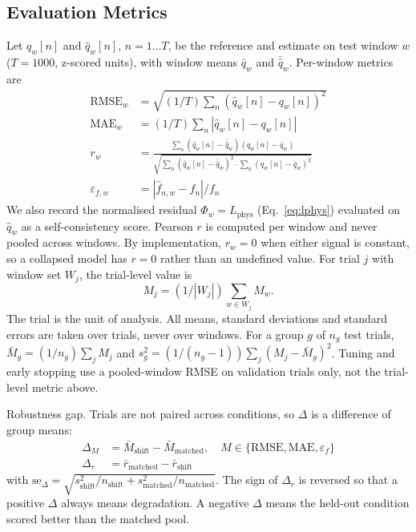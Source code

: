 \documentclass[conference]{IEEEtran}
\begin{document}
\subsection{Evaluation Metrics}
Let $q_w[n]$ and $\hat{q}_w[n]$, $n=1\ldots T$, be the reference and estimate on test window $w$ ($T = 1000$, z-scored units), with window means $\bar{q}_w$ and $\bar{\hat{q}}_w$. Per-window metrics are
\begin{align}
\mathrm{RMSE}_w &= \sqrt{(1/T)\textstyle\sum_n (\hat{q}_w[n] - q_w[n])^2} \label{eq:rmse}\\
\mathrm{MAE}_w &= (1/T)\textstyle\sum_n |\hat{q}_w[n] - q_w[n]| \label{eq:mae}\\
r_w &= \frac{\sum_n (\hat{q}_w[n]-\bar{\hat{q}}_w)(q_w[n]-\bar{q}_w)}{\sqrt{\sum_n(\hat{q}_w[n]-\bar{\hat{q}}_w)^2 \cdot \sum_n(q_w[n]-\bar{q}_w)^2}} \label{eq:r}\\
\varepsilon_{f,w} &= |\hat{f}_{n,w} - f_n| / f_n \label{eq:freq}
\end{align}
We also record the normalised residual $\Phi_w = L_{\mathrm{phys}}$ (Eq.~\ref{eq:lphys}) evaluated on $\hat{q}_w$ as a self-consistency score. Pearson $r$ is computed per window and never pooled across windows. By implementation, $r_w = 0$ when either signal is constant, so a collapsed model has $r = 0$ rather than an undefined value. For trial $j$ with window set $W_j$, the trial-level value is
\begin{equation}
M_j = (1/|W_j|)\textstyle\sum_{w \in W_j} M_w. \label{eq:trial}
\end{equation}
The trial is the unit of analysis. All means, standard deviations and standard errors are taken over trials, never over windows. For a group $g$ of $n_g$ test trials, $\bar{M}_g = (1/n_g)\sum_j M_j$ and $s_g^2 = (1/(n_g-1))\sum_j (M_j - \bar{M}_g)^2$. Tuning and early stopping use a pooled-window RMSE on validation trials only, not the trial-level metric above.

Robustness gap. Trials are not paired across conditions, so $\Delta$ is a difference of group means:
\begin{align}
\Delta_M &= \bar{M}_{\mathrm{shift}} - \bar{M}_{\mathrm{matched}}, \quad M \in \{\mathrm{RMSE}, \mathrm{MAE}, \varepsilon_f\} \label{eq:delta}\\
\Delta_r &= \bar{r}_{\mathrm{matched}} - \bar{r}_{\mathrm{shift}} \label{eq:deltar}
\end{align}
with $\mathrm{se}_\Delta = \sqrt{s^2_{\mathrm{shift}}/n_{\mathrm{shift}} + s^2_{\mathrm{matched}}/n_{\mathrm{matched}}}$. The sign of $\Delta_r$ is reversed so that a positive $\Delta$ always means degradation. A negative $\Delta$ means the held-out condition scored better than the matched pool.
\end{document}
